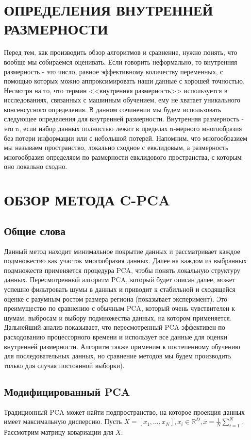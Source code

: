\documentclass[english, russian]{sobraep}
\begin{document}
\section{ОПРЕДЕЛЕНИЯ ВНУТРЕННЕЙ РАЗМЕРНОСТИ}

Перед тем, как производить обзор алгоритмов и сравнение, нужно понять, что вообще мы собираемся оценивать. Если говорить неформально, то внутренняя размерность - это число, равное эффективному количеству переменных, с помощью которых можно аппроксимировать наши данные с хорошей точностью. Несмотря на то, что термин <<внутренняя размерность>> используется в исследованиях, связанных с машинным обучением, ему не хватает уникального консенсусного определения. В данном сочинении мы будем использовать следующее определения для внутренней размерности. Внутренняя размерность - это n, если набор данных полностью лежит в пределах n-мерного многообразия без потери информации или с небольшой потерей. Напомним, что многообразием мы называем пространство, локально сходное с евклидовым, а размерность многообразия определяем по размерности евклидового пространства, с которым оно локально сходно.

\section{ОБЗОР МЕТОДА C-PCA}

\subsection{Общие слова}
Данный метод находит минимальное покрытие данных и рассматривает каждое подмножество как участок многообразия данных. Далее на каждом из выбранных подмножеств применяется процедура PCA, чтобы понять локальную структуру данных. Пересмотренный алгоритм PCA, который будет описан далее, может успешно фильтровать шумы в данных и приводит к стабильной и сходящейся оценке с разумным ростом размера региона (показывает эксперимент). Это преимущество по сравнению с обычным PCA, который очень чувствителен к шумам, выбросам и выбору подмножества данных, на котором применяется. Дальнейший анализ показывает, что пересмотренный PCA эффективен по расходованию процессорного времени и использует все данные для оценки внутренней размерности. Алгоритм также применим к постепенному обучению для последовательных данных, но сравнение методов мы будем производить только для случая постоянной выборки).

\subsection{Модифицированный PCA}
Традиционный PCA может найти подпространство, на которое проекция данных имеет максимальную дисперсию. Пусть $ X = [x_1, ..., x_N], x_i \in \mathbb {R}^{D},  \overline{x} = \frac{1}{N}\sum_{i=1}^N $. Рассмотрим матрицу ковариации для $X$:
\end{document}
